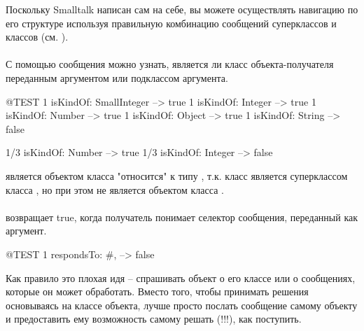 \documentclass[a4paper,10pt,twoside]{book}
\begin{document}
Поскольку Smalltalk написан сам на себе, вы можете осуществлять навигацию по его структуре используя правильную комбинацию сообщений суперклассов и классов (см. ).

\paragraph{}
С помощью сообщения  можно узнать, является ли класс объекта-получателя переданным аргументом или подклассом аргумента.

\begin{code}{@TEST}
1 isKindOf: SmallInteger --> true
1 isKindOf: Integer          --> true
1 isKindOf: Number         --> true
1 isKindOf: Object           --> true
1 isKindOf: String            --> false

1/3 isKindOf: Number      --> true
1/3 isKindOf: Integer        --> false
\end{code}

 является объектом класса  "относится" к типу , т.к. класс  является суперклассом класса , но при этом  не является объектом класса .

\paragraph{}
 возвращает true, когда получатель понимает селектор сообщения, переданный как аргумент.

\begin{code}{@TEST}
1 respondsTo: #, --> false
\end{code}

Как правило это плохая идя -- спрашивать объект о его классе или о сообщениях, которые он может обработать.
Вместо того, чтобы принимать решения основываясь на классе объекта, лучше просто послать сообщение самому объекту и предоставить ему возможность самому решать (!!!), как поступить.
\end{document}

